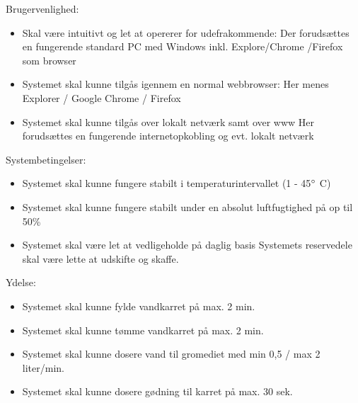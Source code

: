 Brugervenlighed:
\begin{itemize}
	\item Skal være intuitivt og let at opererer for udefrakommende:
	Der forudsættes en fungerende standard PC med Windows inkl. Explore/Chrome	/Firefox som browser

	\item Systemet skal kunne tilgås igennem en normal webbrowser:
		Her menes Explorer / Google Chrome / Firefox
	\item Systemet skal kunne tilgås over lokalt netværk samt over www
		Her forudsættes en fungerende internetopkobling og evt. lokalt netværk
\end{itemize}

Systembetingelser:
\begin{itemize}
	\item Systemet skal kunne fungere stabilt i temperaturintervallet (1 - 45$\degree$ C)
	\item Systemet skal kunne fungere stabilt under en absolut luftfugtighed på op til 50\%
	\item Systemet skal være let at vedligeholde på daglig basis
		Systemets reservedele skal være lette at udskifte og skaffe.
\end{itemize}


Ydelse:
\begin{itemize}
	\item Systemet skal kunne fylde vandkarret på max. 2 min.
	\item Systemet skal kunne tømme vandkarret på max. 2 min.
	\item Systemet skal kunne dosere vand til gromediet med min 0,5 / max 2 liter/min.
	\item Systemet skal kunne dosere gødning til karret på max. 30 sek.
\end{itemize}
